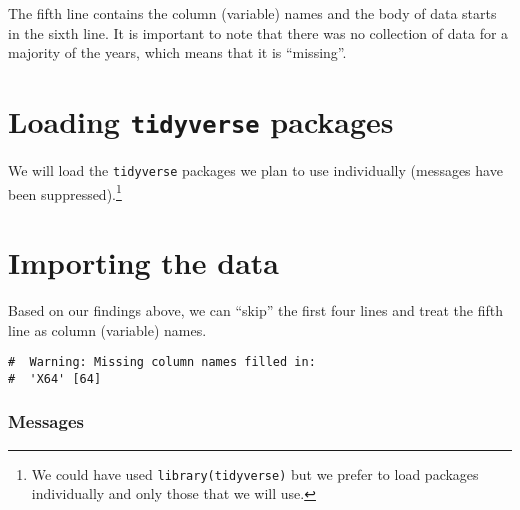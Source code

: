 \documentclass[a4paper,9pt,twocolumn,twoside,printwatermark=false]{pinp}
\begin{document}
The fifth line contains the column (variable) names and the body of data
starts in the sixth line. It is important to note that there was no
collection of data for a majority of the years, which means that it is
``missing''.

\section{\texorpdfstring{Loading \texttt{tidyverse}
packages}{Loading tidyverse packages}}\label{loading-tidyverse-packages}

We will load the \texttt{tidyverse} packages we plan to use individually
(messages have been suppressed).\footnote{We could have used
  \texttt{library(tidyverse)} but we prefer to load packages
  individually and only those that we will use.}

\begin{Shaded}
\begin{Highlighting}[]
\end{Highlighting}
\end{Shaded}

\section{Importing the data}\label{importing-the-data}

Based on our findings above, we can ``skip'' the first four lines and
treat the fifth line as column (variable) names.

\begin{Shaded}
\begin{Highlighting}[]
\StringTok{ }\NormalTok{(}\NormalTok{(}\NormalTok{, }\NormalTok{), }
              \NormalTok{)}
\end{Highlighting}
\end{Shaded}

\begin{ShadedResult}
\begin{verbatim}
#  Warning: Missing column names filled in:
#  'X64' [64]
\end{verbatim}
\end{ShadedResult}

\subsubsection{Messages}\label{messages}
\end{document}
